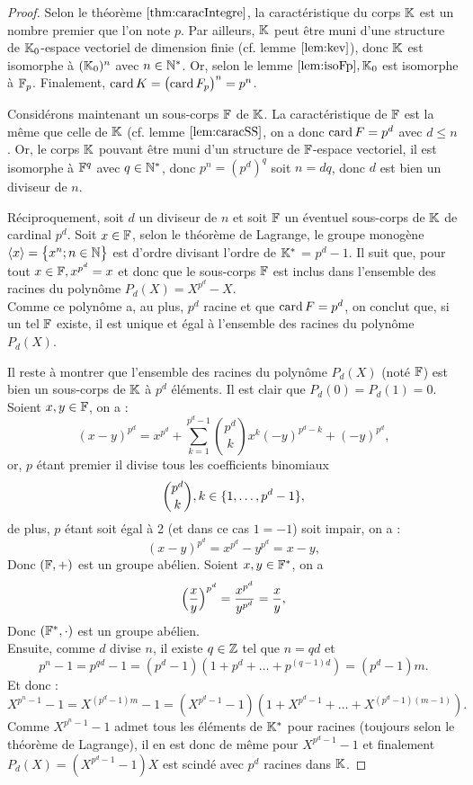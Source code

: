 \begin{proof}

Selon le théorème $\ref{thm:caracIntegre}$, la caractéristique du corps $\K$ est un nombre premier que l'on note $p$.
Par ailleurs, $\K$ peut être muni d'une structure de $\K_0$-espace vectoriel de dimension finie (cf. lemme $\ref{lem:kev}$),
donc $\K$ est isomorphe à $(\K_0)^n$ avec $n \in \Ne$. Or, selon le lemme $\ref{lem:isoFp}, \K_0$ est isomorphe à $\F_p$.
Finalement, $\card{K} = \bigpar{\card{F_p}}^n = p^n$. \newline

Considérons maintenant un sous-corps $\F$ de $\K$. 
La caractéristique de $\F$ est la même que celle de $\K$ (cf. lemme $\ref{lem:caracSS}$, on a donc $\card{F} = p^d$ avec $d \leq n$. 
Or, le corps $\K$ pouvant être muni d'un structure de $\F$-espace vectoriel, il est isomorphe à
$\F^q$ avec $q \in \Ne$, donc $p^n = (p^d)^q$ soit $n = dq$, donc $d$ est bien un diviseur de $n$. \newline

Réciproquement, soit $d$ un diviseur de $n$ et soit $\F$ un éventuel sous-corps de $\K$ de cardinal $p^d$. 
Soit $x \in \F$, selon le théorème de Lagrange, le groupe monogène $\angl{x} = \bigset{x^n ; n \in \N}$ 
est d'ordre divisant l'ordre de $\Ket$ = $p^d-1$.
Il suit que, pour tout $x \in \F, x^{p^d} = x$ et donc que le sous-corps $\F$ est inclus dans l'ensemble des racines du polynôme 
$P_d(X) = X^{p^d} - X$. \\
Comme ce polynôme a, au plus, $p^d$ racine et que $\card{F} = p^d$, on conclut que, si un tel $\F$ existe, il est unique et égal à
l'ensemble des racines du polynôme $P_d(X)$. \newline

Il reste à montrer que l'ensemble des racines du polynôme $P_d(X)$ (noté $\F$) est bien un sous-corps de $\K$ à $p^d$ éléments.
Il est clair que $P_d(0) =P_d(1) = 0$. Soient $x, y \in \F$, on a :
\[ (x-y)^{p^d} = x^{p^d} + \sum_{k=1}^{p^d-1} \binom{p^d}{k} x^k (-y)^{p^d-k} + (-y)^{p^d}, \]
or, $p$ étant premier il divise tous les coefficients binomiaux 
\[ \binom{p^d}{k}, k \in \set{1, \dots, p^d-1} , \]
de plus, $p$ étant soit égal à 2 (et dans ce cas $1=-1$) soit impair, on a :
\[ (x-y)^{p^d} = x^{p^d} - y^{p^d} = x - y, \]
Donc $(\F, +)$ est un groupe abélien. 
Soient $x, y \in \F^{\ast}$, on a 
\[ \Bigpar{\dfrac{x}{y}}^{p^d} = \dfrac{x^{p^d}}{y^{p^d}} = \dfrac{x}{y}, \]
Donc $(\F^{\ast}, \cdot)$ est un groupe abélien. \\
Ensuite, comme $d$ divise $n$, il existe $q \in \Z$ tel que $n = qd$ et 
\[ p^n-1 = p^{qd}-1 = (p^d-1)(1+p^d+\dots+p^{(q-1)d}) = (p^d-1)m . \]
Et donc :
\[ X^{p^n-1} - 1 = X^{(p^d-1)m}-1 = (X^{p^d-1} -1)(1 + X^{p^d-1} + \dots + X^{(p^d-1)(m-1)}) . \]
Comme $X^{p^n-1}-1$ admet tous les éléments de $\Ket$ pour racines (toujours selon le théorème de Lagrange), 
il en est donc de même pour $X^{p^d-1} -1$ et finalement $P_d(X) = (X^{p^d-1} -1)X$ est scindé avec $p^d$ racines dans $\K$.
\end{proof}

